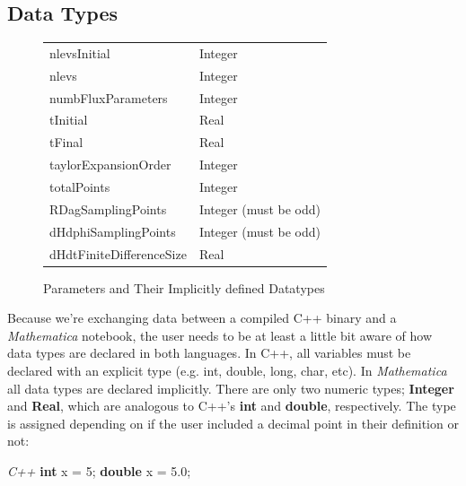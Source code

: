 \documentclass[12pt]{article}
\begin{document}
\subsection{Data Types}
\begin{figure} [h!]
\begin{center}
    \begin{tabular}{  l| l  }

    nlevsInitial & Integer  \\ 
    nlevs & Integer  \\ 
    numbFluxParameters & Integer \\ 
    tInitial & Real  \\ 
    tFinal & Real  \\ 
    taylorExpansionOrder & Integer  \\ 
    totalPoints & Integer  \\ 
    RDagSamplingPoints & Integer (must be odd)  \\ 
    dHdphiSamplingPoints & Integer (must be odd)  \\ 
    dHdtFiniteDifferenceSize & Real
    \end{tabular}
\end{center}
\caption{Parameters and Their Implicitly defined Datatypes}
\label{parameterTable}
\end{figure}
Because we're exchanging data between a compiled C++ binary and a \textit{Mathematica} notebook, the user needs to be at least a little bit aware of how data types are declared in both languages. 
\newline
\newline 
In C++, all variables must be declared with an explicit type (e.g. int, double, long, char, etc).
\newline
\newline
In \textit{Mathematica} all data types are declared implicitly. There are only two numeric types; \textbf{Integer} and \textbf{Real}, which are analogous to C++'s \textbf{int} and \textbf{double}, respectively. The type is assigned depending on if the user included a decimal point in their definition or not:
\newline
\newline
\begin{minipage}[t]{0.5\textwidth}
\centering \textit{C++}
\newline
\newline
\textbf{int} x = 5;
\newline
\textbf{double} x = 5.0;
\newline
\newline
\end{minipage}
\end{document}
